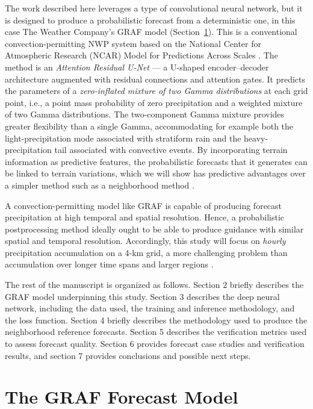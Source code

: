 \documentclass[11pt]{article}
\begin{document}
The work described here leverages a type of convolutional 
neural network, but it is designed to produce a probabilistic
forecast from a deterministic one, in this case The Weather Company's GRAF model (Section~\ref{sec:graf}).
This is a conventional convection-permitting NWP system based on the 
National Center for Atmospheric Research (NCAR) Model for Predictions Across 
Scales \citep[MPAS;][]{skamarock2012}.  The method is an \emph{Attention Residual U-Net}
--- a U-shaped encoder--decoder architecture augmented with
residual connections and attention gates. It predicts the
parameters of a \emph{zero-inflated mixture of two Gamma
distributions} at each grid point, i.e., a point mass probability
of zero precipitation and a weighted mixture of two Gamma distributions.  The two-component Gamma
mixture provides greater flexibility than a single Gamma,
accommodating for example both the light-precipitation mode associated with
stratiform rain and the heavy-precipitation tail associated with
convective events.  By incorporating terrain information as predictive features, the probabilistic forecasts
that it generates can be linked to terrain variations, which we will show has predictive advantages
over a simpler method such as a neighborhood method \citep{theis2005, schwartz2017}.

A convection-permitting model like GRAF is capable of producing forecast precipitation at high
temporal and spatial resolution.  Hence, a probabilistic postprocessing method ideally ought
to be able to produce guidance with similar spatial and temporal resolution.
Accordingly, this study will focus on {\it hourly} precipitation
accumulation on a 4-km grid, a more challenging problem than accumulation
over longer time spans and larger regions \citep{roberts2008}.

The rest of the manuscript is organized as follows.   Section 2 briefly describes the GRAF model
underpinning this study.  Section 3 describes the deep neural network, including the data used, the
training and inference methodology, and the loss function.  Section 4 briefly describes the methodology
used to produce the neighborhood reference forecasts.   Section 5 describes the verification metrics
used to assess forecast quality.  Section 6 provides forecast case studies and verification results,
and section 7 provides conclusions and possible next steps.

\section{The GRAF Forecast Model}
\label{sec:graf}
\end{document}
